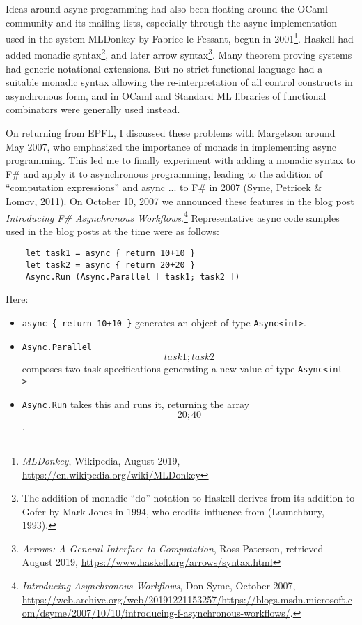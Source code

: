 \documentclass[acmsmall,review]{acmart}\settopmatter{printfolios=true,printccs=false,printacmref=false}
\begin{document}
Ideas around async programming had also been floating around the OCaml community and its mailing lists, especially through the async implementation used in the system MLDonkey by Fabrice le Fessant, begun in 2001\footnote{\textit{MLDonkey}, Wikipedia, August 2019, \url{https://en.wikipedia.org/wiki/MLDonkey}}.  Haskell had added monadic syntax\footnote{The addition of  monadic “do” notation to Haskell derives from its addition to Gofer by Mark Jones in 1994, who credits influence from (Launchbury, 1993).}, and later arrow syntax\footnote{\textit{Arrows: A General Interface to Computation}, Ross Paterson, retrieved August 2019, \url{https://www.haskell.org/arrows/syntax.html}}.  Many theorem proving systems had generic notational extensions. But no strict functional language had a suitable monadic syntax allowing the re-interpretation of all control constructs in asynchronous form, and in OCaml and Standard ML libraries of functional combinators were generally used instead.  

On returning from EPFL, I discussed these problems with Margetson around May 2007, who emphasized the importance of monads in implementing async programming. This led me to finally experiment with adding a monadic syntax to F\# and apply it to asynchronous programming, leading to the addition of “computation expressions” and async { ... } to F\# in 2007 (Syme, Petricek \& Lomov, 2011).  On October 10, 2007 we announced these features in the blog post \textit{Introducing F\# Asynchronous Workflows}.\footnote{\textit{Introducing Asynchronous Workflows}, Don Syme, October 2007, \url{https://web.archive.org/web/20191221153257/https://blogs.msdn.microsoft.com/dsyme/2007/10/10/introducing-f-asynchronous-workflows/}.}  Representative async code samples used in the blog posts at the time were as follows:

\begin{verbatim}
    let task1 = async { return 10+10 }
    let task2 = async { return 20+20 }
    Async.Run (Async.Parallel [ task1; task2 ])
\end{verbatim}

Here:
\begin{itemize}
\item \texttt{async \{ return 10+10 \}} generates an object of type \texttt{Async<int>}.  
\item \texttt{Async.Parallel \[ task1; task2 \]} composes two task specifications generating a new value of type \texttt{Async<int\[\]>}
\item \texttt{Async.Run} takes this and runs it, returning the array \texttt{\[20; 40\]}. 
\end{itemize}
\end{document}
